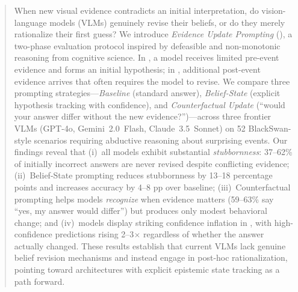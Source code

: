 \begin{abstract}
When new visual evidence contradicts an initial interpretation, do vision-language models (VLMs) genuinely revise their beliefs, or do they merely rationalize their first guess?  We introduce \emph{Evidence Update Prompting} (\method), a two-phase evaluation protocol inspired by defeasible and non-monotonic reasoning from cognitive science.  In \phaseA, a model receives limited pre-event evidence and forms an initial hypothesis; in \phaseB, additional post-event evidence arrives that often requires the model to revise.  We compare three prompting strategies---\emph{Baseline} (standard answer), \emph{Belief-State} (explicit hypothesis tracking with confidence), and \emph{Counterfactual Update} (``would your answer differ without the new evidence?'')---across three frontier VLMs (GPT-4o, Gemini~2.0~Flash, Claude~3.5~Sonnet) on 52 BlackSwan-style scenarios requiring abductive reasoning about surprising events.  Our findings reveal that (i)~all models exhibit substantial \emph{stubbornness}: 37--62\% of initially incorrect answers are never revised despite conflicting evidence; (ii)~Belief-State prompting reduces stubbornness by 13--18 percentage points and increases accuracy by 4--8 pp over baseline; (iii)~Counterfactual prompting helps models \emph{recognize} when evidence matters (59--63\% say ``yes, my answer would differ'') but produces only modest behavioral change; and (iv)~models display striking confidence inflation in \phaseB, with high-confidence predictions rising 2--3$\times$ regardless of whether the answer actually changed.  These results establish that current VLMs lack genuine belief revision mechanisms and instead engage in post-hoc rationalization, pointing toward architectures with explicit epistemic state tracking as a path forward.
\end{abstract}
